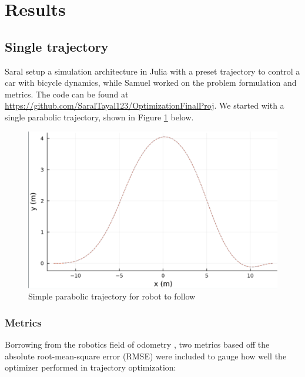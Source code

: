 \documentclass[11pt]{article}
\begin{document}
    \section{Results} \label{sec:results}
    \subsection{Single trajectory} \label{sec:results:singletraj}
    Saral setup a simulation architecture in Julia with a preset trajectory to control a car with bicycle dynamics, while Samuel worked on the problem formulation and metrics. The code can be found at \href{https://github.com/SaralTayal123/OptimizationFinalProj}{https://github.com/SaralTayal123/OptimizationFinalProj}. We started with a single parabolic trajectory, shown in Figure \ref{fig:trajectory} below.
    
    \begin{figure}[h!]
        \centering
        \includegraphics[width=0.5\linewidth]{trajectory}
        \caption{Simple parabolic trajectory for robot to follow}
        \label{fig:trajectory}
    \end{figure}

    \subsubsection{Metrics} \label{sec:results:metrics}
    Borrowing from the robotics field of odometry \cite{metrics1}, two metrics based off the absolute root-mean-square error (RMSE) were included to gauge how well the optimizer performed in trajectory optimization:
    \pagebreak
    
\end{document}
